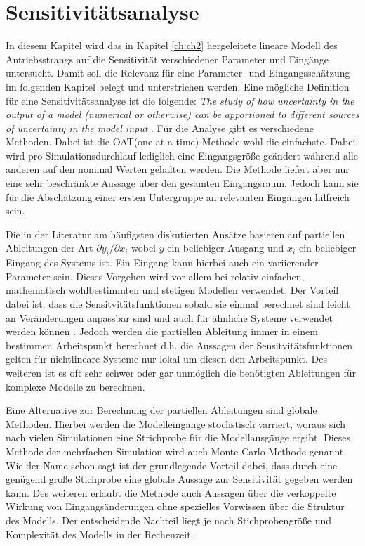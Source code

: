 \chapter{Sensitivitätsanalyse}\label{ch:Sensitivity}\label{ch:ch3}
In diesem Kapitel wird das in Kapitel \ref{ch:ch2} hergeleitete lineare Modell des Antriebsstrangs auf die Sensitivität verschiedener Parameter und Eingänge untersucht. Damit soll die Relevanz für eine Parameter- und Eingangsschätzung im folgenden Kapitel belegt und unterstrichen werden.
Eine mögliche Definition für eine Sensitivitätsanalyse ist die folgende: \emph{The study of how uncertainty in the output of a model (numerical or otherwise) can be apportioned to different sources of uncertainty in the model input} \cite{Saltelli.2004}.
Für die Analyse gibt es verschiedene Methoden. Dabei ist die OAT(one-at-a-time)-Methode wohl die einfachste. Dabei wird pro Simulationsdurchlauf lediglich eine Eingangsgröße geändert während alle anderen auf den nominal Werten gehalten werden. Die Methode liefert aber nur eine sehr beschränkte Aussage über den gesamten Eingangsraum. Jedoch kann sie für die Abschätzung einer ersten Untergruppe an relevanten Eingängen hilfreich sein.    

 Die in der Literatur am häufigsten diskutierten Ansätze basieren auf partiellen Ableitungen der Art $\partial y_i/\partial x_i$ wobei $y$ ein beliebiger Ausgang und $x_i$ ein beliebiger Eingang des Systems ist. Ein Eingang kann hierbei auch ein variierender Parameter sein. Dieses Vorgehen wird vor allem bei relativ einfachen, mathematisch wohlbestimmten und stetigen Modellen verwendet. Der Vorteil dabei ist, dass die Sensitvitätsfunktionen sobald sie einmal berechnet sind leicht an Veränderungen anpassbar sind und auch für ähnliche Systeme verwendet werden können \cite{Karnavas.1993}. Jedoch werden die partiellen Ableitung immer in einem bestimmen Arbeitspunkt berechnet d.h. die Aussagen der Sensitvitätsfunktionen gelten für nichtlineare Systeme nur lokal um diesen den Arbeitspunkt. Des weiteren ist es oft sehr schwer oder gar unmöglich die benötigten Ableitungen für komplexe Modelle zu berechnen.

Eine Alternative zur Berechnung der partiellen Ableitungen sind globale Methoden. Hierbei werden die Modelleingänge stochstisch varriert, woraus sich nach vielen Simulationen eine Strichprobe für die Modellausgänge ergibt. Dieses Methode der mehrfachen Simulation wird auch Monte-Carlo-Methode genannt. Wie der Name schon sagt ist der grundlegende Vorteil dabei, dass durch eine genügend große Stichprobe eine globale Aussage zur Sensitivität gegeben werden kann. Des weiteren erlaubt die Methode auch Aussagen über die verkoppelte Wirkung von Eingangsänderungen ohne spezielles Vorwissen über die Struktur des Modells. Der entscheidende Nachteil liegt je nach Stichprobengröße und Komplexität des Modells in der Rechenzeit.      

